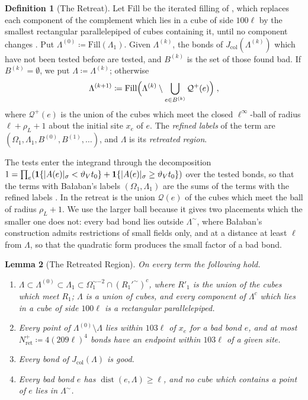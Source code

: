 \documentclass[11pt]{preprint}
\newcommand{\id}{\mathbf 1}
\newcommand{\dist}{\operatorname{dist}}
\DeclarePairedDelimiter{\abs}{\lvert}{\rvert}
\numberwithin{equation}{section}
\newtheorem{lemma}{Lemma}[section]
\theoremstyle{definition}
\newtheorem{definition}[lemma]{Definition}
\theoremstyle{remark}
\theoremstyle{plain}
\begin{document}
\begin{definition}[The Retreat]\label{def:retreat}
Let $\mathrm{Fill}$ be the iterated filling of \cite[p.~251]{BalabanCRE}, which replaces each component of the complement which lies in a cube of side $100\ell$ by the smallest rectangular parallelepiped of cubes containing it, until no component changes \cite[Section~9.4.1]{WilsonFirstStep}. Put $\Lambda^{(0)} \coloneqq \mathrm{Fill}(\Lambda_1)$. Given $\Lambda^{(k)}$, the bonds of $J_{\mathrm{col}}(\Lambda^{(k)})$ which have not been tested before are tested, and $B^{(k)}$ is the set of those found bad. If $B^{(k)} = \emptyset$, we put $\Lambda \coloneqq \Lambda^{(k)}$; otherwise
\begin{equation}\label{eq:retreat}
    \Lambda^{(k+1)} \coloneqq \mathrm{Fill}\Bigl(\Lambda^{(k)} \setminus \bigcup_{e \in B^{(k)}}\mathcal Q^+(e)\Bigr)\;,
\end{equation}
where $\mathcal Q^+(e)$ is the union of the cubes which meet the closed $\ell^\infty$-ball of radius $\ell + \rho_L + 1$ about the initial site $x_e$ of $e$. The \emph{refined labels} of the term are $(\Omega_1, \Lambda_1, B^{(0)}, B^{(1)}, \dots)$, and $\Lambda$ is its \emph{retreated region}.
\end{definition}

The tests enter the integrand through the decomposition $1 = \prod_e(\id\{\abs{A(e)}_\sigma < \vartheta_Vt_0\} + \id\{\abs{A(e)}_\sigma \geq \vartheta_Vt_0\})$ over the tested bonds, so that the terms with Ba{\l}aban's labels $(\Omega_1, \Lambda_1)$ are the sums of the terms with the refined labels \cite[Section~9.4.1]{WilsonFirstStep}. In \cite{WilsonFirstStep} the retreat is the union $\mathcal Q(e)$ of the cubes which meet the ball of radius $\rho_L + 1$. We use the larger ball because it gives two placements which the smaller one does not: every bad bond lies outside $\Lambda^\sim$, where Ba{\l}aban's construction admits restrictions of small fields only, and at a distance at least $\ell$ from $\Lambda$, so that the quadratic form produces the small factor of a bad bond.

\begin{lemma}[The Retreated Region]\label{lem:retreated-region}
On every term the following hold.
\begin{enumerate}[label=(\roman*)]
\item $\Lambda \subset \Lambda^{(0)} \subset \Lambda_1 \subset \Omega_1^{\sim-2} \cap (R_1'^{\sim})^c$, where $R'_1$ is the union of the cubes which meet $R_1$; $\Lambda$ is a union of cubes, and every component of $\Lambda^c$ which lies in a cube of side $100\ell$ is a rectangular parallelepiped.
\item Every point of $\Lambda^{(0)} \setminus \Lambda$ lies within $103\ell$ of $x_e$ for a bad bond $e$, and at most $N^+_{\mathrm{ret}} \coloneqq 4(209\ell)^4$ bonds have an endpoint within $103\ell$ of a given site.
\item Every bond of $J_{\mathrm{col}}(\Lambda)$ is good.
\item Every bad bond $e$ has $\dist(e, \Lambda) \geq \ell$, and no cube which contains a point of $e$ lies in $\Lambda^\sim$.
\end{enumerate}
\end{lemma}
\end{document}

